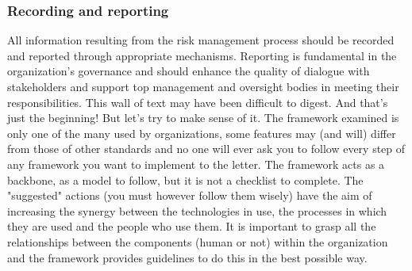 \subsubsection{Recording and reporting}
All information resulting from the risk management process should be recorded and reported through appropriate mechanisms. Reporting is fundamental in the organization’s governance and should enhance the quality of dialogue with stakeholders and support top management and oversight bodies in meeting their responsibilities.\vspace{3cm}\newline
This wall of text may have been difficult to digest. And that's just the beginning! But let's try to make sense of it. The framework examined is only one of the many used by organizations, some features may (and will) differ from those of other standards and no one will ever ask you to follow every step of any framework you want to implement to the letter. The framework acts as a backbone, as a model to follow, but it is not a checklist to complete. The "suggested" actions (you must however follow them wisely) have the aim of increasing the synergy between the technologies in use, the processes in which they are used and the people who use them. It is important to grasp all the relationships between the components (human or not) within the organization and the framework provides guidelines to do this in the best possible way.

